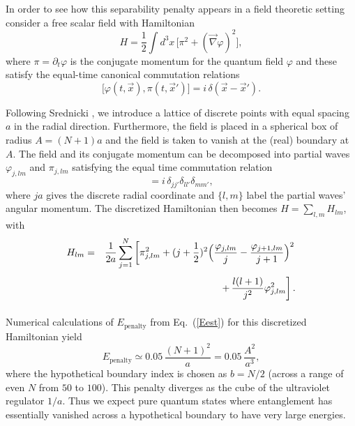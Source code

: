 \documentclass[aps,showpacs,prl,12pt]{revtex4}
\begin{document}
In order to see how this separability penalty appears in a field
theoretic setting consider a free scalar field with Hamiltonian
\begin{equation}
H=\frac{1}{2}\int d^3 x\,
\bigl[\pi^2+(\vec \nabla \varphi)^2\bigr],
\end{equation}
where $\pi=\partial_t \varphi$ is the conjugate momentum for the quantum
field $\varphi$ and these satisfy the equal-time canonical commutation
relations
\begin{equation}
\bigl[\varphi(t,\vec x),\pi(t,\vec x')\bigr]=i\, \delta(\vec x-\vec x').
\end{equation}

Following Srednicki \cite{Srednickiapp}, we introduce a lattice of discrete
points with equal spacing $a$ in the radial direction. Furthermore, the
field is placed in a spherical box of radius $A=(N+1)a$ and the field
is taken to vanish at the (real) boundary at $A$. The field and its
conjugate momentum can be decomposed into partial waves $\varphi_{j,lm}$
and $\pi_{j,lm}$ satisfying the equal time commutation relation
\begin{equation}
[\varphi_{j,lm}, \pi_{j',l'm'}]=i\,\delta_{jj'} \delta_{ll'} \delta_{mm'},
\end{equation}
where $j a$ gives the discrete radial coordinate and $\{l,m\}$
label the partial waves' angular momentum. The discretized
Hamiltonian then becomes $H=\sum_{l,m} H_{lm}$, with \cite{Srednickiapp}
\begin{eqnarray}
H_{lm}&=&\frac{1}{2a}\sum_{j=1}^N\left[
\pi_{j,lm}^2 +(j+\frac{1}{2})^2\Bigl(\frac{\varphi_{j,lm}}{j}
-\frac{\varphi_{j+1,lm}}{j+1}\Bigr)^2 \right.\nonumber\\
&&\phantom{\frac{1}{2a}\sum_{j=1}^N~}\left.
+\,\frac{l(l+1)}{j^2}\varphi_{j,lm}^2\right].
\label{Hfield}
\end{eqnarray}

Numerical calculations of $E_{\text{penalty}}$ from Eq.~(\ref{Eest}) for
this discretized Hamiltonian yield
\begin{equation}
E_{\text{penalty}}\simeq 0.05\, \frac{(N+1)^2}{a}=
0.05\, \frac{A^2}{a^3},
\end{equation}
where the hypothetical boundary index is chosen as $b=N/2$ (across a
range of even $N$ from $50$ to $100$). This penalty diverges as the
cube of the ultraviolet regulator $1/a$. Thus we expect pure quantum
states where entanglement has essentially vanished across a hypothetical
boundary to have very large energies.
\end{document}
